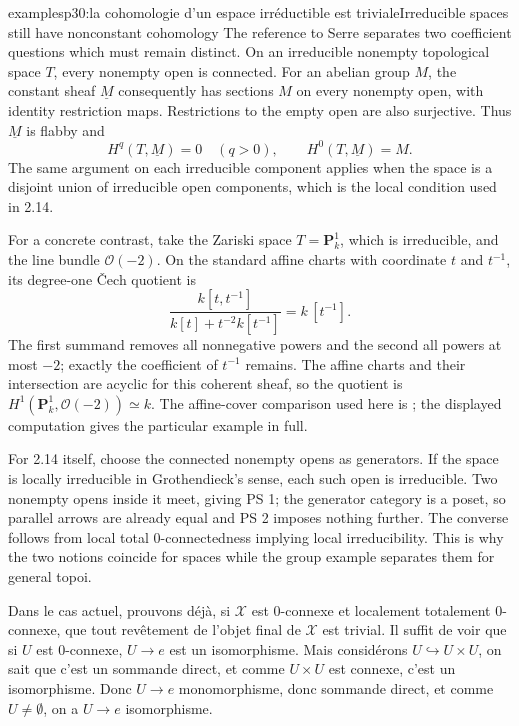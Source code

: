 \begin{dcomment}{examples}{p30:la cohomologie d'un espace irréductible est triviale}{Irreducible spaces still have nonconstant cohomology}
The reference to Serre separates two coefficient questions which must remain distinct. On an irreducible nonempty topological space $T$, every nonempty open is connected. For an abelian group $M$, the constant sheaf $\underline M$ consequently has sections $M$ on every nonempty open, with identity restriction maps. Restrictions to the empty open are also surjective. Thus $\underline M$ is flabby and
\[
 H^q(T,\underline M)=0\quad(q>0),\qquad
 H^0(T,\underline M)=M.
\]
The same argument on each irreducible component applies when the space is a disjoint union of irreducible open components, which is the local condition used in 2.14.

For a concrete contrast, take the Zariski space $T=\mathbf P^1_k$, which is irreducible, and the line bundle $\mathcal O(-2)$. On the standard affine charts with coordinate $t$ and $t^{-1}$, its degree-one \v{C}ech quotient is
\[
 \frac{k[t,t^{-1}]}{k[t]+t^{-2}k[t^{-1}]}
   =k\,[t^{-1}].
\]
The first summand removes all nonnegative powers and the second all powers at most $-2$; exactly the coefficient of $t^{-1}$ remains. The affine charts and their intersection are acyclic for this coherent sheaf, so the quotient is $H^1(\mathbf P^1_k,\mathcal O(-2))\simeq k$. The affine-cover comparison used here is \citet[no.~47, Theorem 4]{Serre1955FAC}; the displayed computation gives the particular example in full.

For 2.14 itself, choose the connected nonempty opens as generators. If the space is locally irreducible in Grothendieck's sense, each such open is irreducible. Two nonempty opens inside it meet, giving PS 1; the generator category is a poset, so parallel arrows are already equal and PS 2 imposes nothing further. The converse follows from local total $0$-connectedness implying local irreducibility. This is why the two notions coincide for spaces while the group example separates them for general topoi.
\end{dcomment}


Dans le cas actuel, prouvons déjà, si $\mathcal{X}$ est 0-connexe et localement totalement 0-connexe, que tout revêtement de l'objet final de $\mathcal{X}$ est trivial. Il suffit de voir que si $U$ est 0-connexe, $U \longrightarrow e$ est un isomorphisme. Mais considérons $U \hookrightarrow U \times U$, on sait que c'est un sommande direct, et comme $U \times U$ est connexe, c'est un isomorphisme. Donc $U \longrightarrow e$ monomorphisme, donc sommande direct, et comme $U \neq \emptyset$, on a $U \longrightarrow e$ isomorphisme.

